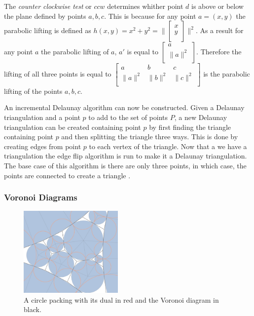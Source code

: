 \documentclass[11pt]{article}
\theoremstyle{definition}
\begin{document}
	The \emph{counter clockwise test} or $ccw$ determines whither point $d$ is above or below the plane defined by points $a,b,c$. 
	This is because for any point $a = (x,y)$ the parabolic lifting is defined as $h(x,y) = x^2 + y^2 = \| 
	\begin{bmatrix} 
		x \\
		y \\ 
	\end{bmatrix} 
	\|^2$.
	As a result for any point $a$ the parabolic lifting of $a$, $a'$ is equal to $
	\begin{bmatrix} 
		a \\ 
		\| a \|^2 \\ 
	\end{bmatrix}$. 
	Therefore the lifting of all three points is equal to
	$\begin{bmatrix}
    			a & b & c \\
    			\|a\|^2 & \|b\|^2 & \|c\|^2 \\
	\end{bmatrix}$ 
	is the parabolic lifting of the points $a,b,c$.

	An incremental Delaunay algorithm can now be constructed. 
	Given a Delaunay triangulation and a point $p$ to add to the set of points $P$, a new Delaunay triangulation can be created containing point $p$ by first finding the triangle containing point $p$ and then splitting the triangle three ways. 
	This is done by creating edges from point $p$ to each vertex of the triangle. 
	Now that a we have a triangulation the edge flip algorithm is run to make it a Delaunay triangulation. 
	The base case of this algorithm is there are only three points, in which case, the points are connected to create a triangle \cite{meshGeneration}. 

\subsubsection{Voronoi Diagrams}

	\begin{figure}
  		\begin{center}
    		\includegraphics[scale=.18,width=0.45\textwidth]{voronoi}
  		\end{center}
  		\caption{A circle packing with its dual in red and the Voronoi diagram in black.}
	\end{figure}
\end{document}
